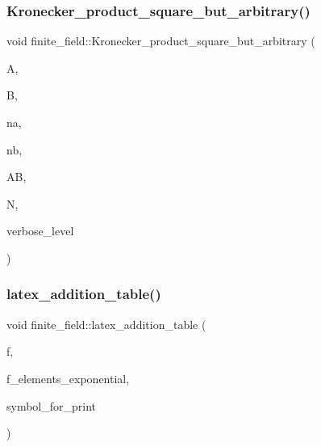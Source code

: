 \subsubsection{\texorpdfstring{Kronecker\+\_\+product\+\_\+square\+\_\+but\+\_\+arbitrary()}{Kronecker\_product\_square\_but\_arbitrary()}}
{\footnotesize\ttfamily void finite\+\_\+field\+::\+Kronecker\+\_\+product\+\_\+square\+\_\+but\+\_\+arbitrary (\begin{DoxyParamCaption}\item[{\mbox{\hyperlink{galois_8h_a09fddde158a3a20bd2dcadb609de11dc}{I\+NT}} $\ast$}]{A,  }\item[{\mbox{\hyperlink{galois_8h_a09fddde158a3a20bd2dcadb609de11dc}{I\+NT}} $\ast$}]{B,  }\item[{\mbox{\hyperlink{galois_8h_a09fddde158a3a20bd2dcadb609de11dc}{I\+NT}}}]{na,  }\item[{\mbox{\hyperlink{galois_8h_a09fddde158a3a20bd2dcadb609de11dc}{I\+NT}}}]{nb,  }\item[{\mbox{\hyperlink{galois_8h_a09fddde158a3a20bd2dcadb609de11dc}{I\+NT}} $\ast$}]{AB,  }\item[{\mbox{\hyperlink{galois_8h_a09fddde158a3a20bd2dcadb609de11dc}{I\+NT}} \&}]{N,  }\item[{\mbox{\hyperlink{galois_8h_a09fddde158a3a20bd2dcadb609de11dc}{I\+NT}}}]{verbose\+\_\+level }\end{DoxyParamCaption})}

\mbox{\label{classfinite__field_a4487b3df0993aeda7451e30d21aa2f57}} 
\subsubsection{\texorpdfstring{latex\+\_\+addition\+\_\+table()}{latex\_addition\_table()}}
{\footnotesize\ttfamily void finite\+\_\+field\+::latex\+\_\+addition\+\_\+table (\begin{DoxyParamCaption}\item[{ostream \&}]{f,  }\item[{\mbox{\hyperlink{galois_8h_a09fddde158a3a20bd2dcadb609de11dc}{I\+NT}}}]{f\+\_\+elements\+\_\+exponential,  }\item[{const \mbox{\hyperlink{galois_8h_ab6cc7b4aeb6ea31aba2b3fbfc83ff5e6}{B\+Y\+TE}} $\ast$}]{symbol\+\_\+for\+\_\+print }\end{DoxyParamCaption})}

